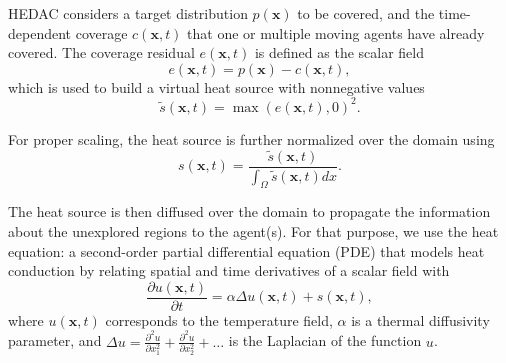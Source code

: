 \documentclass[10pt,a4paper]{article} %
\begin{document}


HEDAC considers a target distribution $p(\bm{x})$ to be covered, and the time-dependent coverage $c(\bm{x},t)$ that one or multiple moving agents have already covered. The coverage residual $e(\bm{x},t)$ is defined as the scalar field 
\begin{equation}
    e(\bm{x},t) = p(\bm{x}) - c(\bm{x},t),
    \label{eq:error_residual}
\end{equation}
which is used to build a virtual heat source with nonnegative values
\begin{equation}
   \tilde{s}(\bm{x},t) = \max\left(e(\bm{x},t),0\right)^2.
\end{equation}

For proper scaling, the heat source is further normalized over the domain using
\begin{equation}
   s(\bm{x},t) = \frac{\tilde{s}(\bm{x},t)}{\int_{\Omega}\tilde{s}(\bm{x},t)dx}.
   \label{eq:normalization}
\end{equation}

The heat source is then diffused over the domain to propagate the information about the unexplored regions to the agent(s). For that purpose, we use the heat equation: a second-order partial differential equation (PDE) that models heat conduction by relating spatial and time derivatives of a scalar field with
\begin{equation}
    \frac{\partial u(\bm{x},t)}{\partial t} = \alpha \Delta u(\bm{x},t) + s(\bm{x},t), %
     \label{eq:heat}
\end{equation}
where $u(\bm{x},t)$ corresponds to the temperature field, $\alpha$ is a thermal diffusivity parameter, and $\Delta u= \frac{\partial^2 u}{\partial x_1^2} + \frac{\partial^2 u}{\partial x_2^2} + \ldots$ is the Laplacian of the function $u$.
\end{document}
